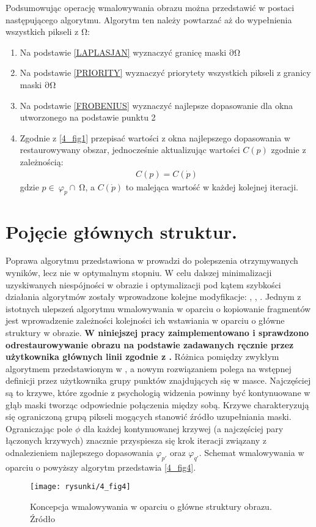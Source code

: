 \documentclass[12pt, twoside, openany]{report}
\theoremstyle{definition}
\begin{document}
Podsumowując operację wmalowywania obrazu można przedstawić w postaci następującego algorytmu. Algorytm ten należy powtarzać aż do wypełnienia wszystkich pikseli z $\mathrm{\Omega }$:
\begin{enumerate}
\item
Na podstawie \eqref{LAPLASJAN} wyznaczyć granicę maski $\mathrm{\partial }\mathrm{\Omega }$
\item
Na podstawie \eqref{PRIORITY} wyznaczyć priorytety wszystkich pikseli z granicy maski $\mathrm{\partial }\mathrm{\Omega }$
\item
Na podstawie \eqref{FROBENIUS} wyznaczyć najlepsze dopasowanie dla okna utworzonego na podstawie punktu 2 
\item
Zgodnie z \autoref{4_fig1} przepisać wartości z okna najlepszego dopasowania w restaurowywany obszar, jednocześnie aktualizując wartości $C(p)$ zgodnie z zależnością:
\begin{align}
C\left(p\right)=C\left(\dot{p}\right)
\end{align} 
gdzie $p\in \ {\varphi }_p\cap \ \mathrm{\Omega }$, a $C\left(\dot{p}\right)$ to malejąca wartość w każdej kolejnej iteracji.
\end{enumerate}
\section{Pojęcie głównych struktur.}
Poprawa algorytmu przedstawiona w \cite{criminisi2004region} prowadzi do polepszenia otrzymywanych wyników, lecz nie w optymalnym stopniu. W celu dalszej minimalizacji uzyskiwanych niespójności w obrazie i optymalizacji pod kątem szybkości działania algorytmów zostały wprowadzone kolejne modyfikacje: \cite{StructurePropagationManual},  \cite{malluvalasaimplementation}, \cite{SalientStrucTexProp}. 
Jednym z istotnych ulepszeń algorytmu wmalowywania w oparciu o kopiowanie fragmentów jest wprowadzenie zależności kolejności ich wstawiania w oparciu o główne struktury w obrazie.
\textbf{W niniejszej pracy zaimplementowano i sprawdzono odrestaurowywanie obrazu na podstawie zadawanych ręcznie przez użytkownika głównych linii zgodnie z \cite{StructurePropagationManual}.}
Różnica pomiędzy zwykłym algorytmem przedstawionym w \cite{criminisi2004region}, a nowym rozwiązaniem polega na wstępnej definicji przez użytkownika grupy punktów znajdujących się w masce. Najczęściej są to krzywe, które zgodnie z psychologią widzenia powinny być kontynuowane w głąb maski tworząc odpowiednie połączenia między sobą. Krzywe charakteryzują się ograniczoną grupą pikseli mogących stanowić źródło uzupełniania maski. Ograniczając pole $\phi $ dla każdej kontynuowanej krzywej (a najczęściej pary łączonych krzywych) znacznie przyspiesza się krok iteracji związany z odnalezieniem najlepszego dopasowania ${\varphi }_{p'}$ oraz ${\varphi }_{q'}$. Schemat wmalowywania w oparciu o powyższy algorytm przedstawia \autoref{4_fig4}.
\begin{figure}[!h]
	\centering
	\texttt{[image: rysunki/4\_fig4]}
	\caption{Koncepcja wmalowywania w oparciu o główne struktury obrazu. Źródło \cite{StructurePropagationManual}}
	\label{4_fig4} 
\end{figure}
\end{document}
